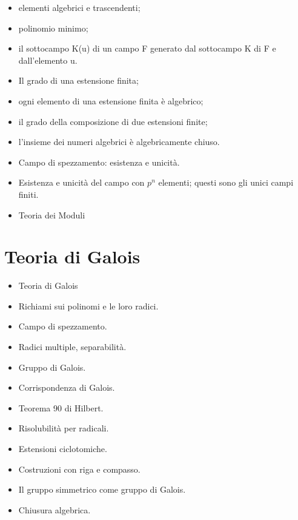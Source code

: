 \documentclass[a4paper,10pt]{article}
\begin{document}
\begin{itemize}
 \item elementi algebrici e trascendenti;
 \item polinomio minimo; 
 \item il sottocampo K(u) di un campo F generato dal sottocampo K di F e dall'elemento u. 
 \item Il grado di una estensione finita; 
 \item ogni elemento di una estensione finita è algebrico; 
 \item il grado della composizione di due estensioni finite; 
 \item l'insieme dei numeri algebrici è algebricamente chiuso. 
 \item Campo di spezzamento: esistenza e unicità. 
 \item Esistenza e unicità del campo con $p^n$ elementi; questi sono gli unici campi finiti.
 \item Teoria dei Moduli
\end{itemize}

\section*{Teoria di Galois}
\begin{itemize}
 \item Teoria di Galois
 \item Richiami sui polinomi e le loro radici. 
 \item Campo di spezzamento. 
 \item Radici multiple, separabilità.
 \item Gruppo di Galois. 
 \item Corrispondenza di Galois. 
 \item Teorema 90 di Hilbert.
 \item Risolubilità per radicali. 
 \item Estensioni ciclotomiche.
 \item Costruzioni con riga e compasso.
 \item Il gruppo simmetrico come gruppo di Galois.
 \item Chiusura algebrica.
\end{itemize}
\end{document}
